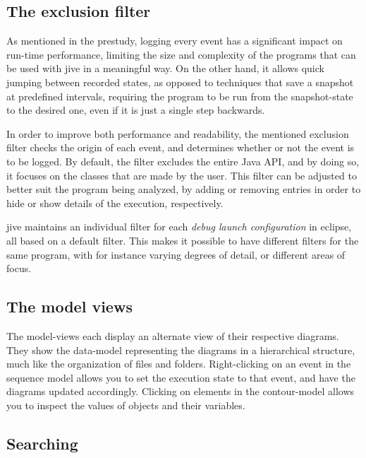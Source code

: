 \subsection{The exclusion filter}\label{jiveFeatFilter}

As mentioned in the prestudy, logging every event has a significant impact on run-time performance, limiting the size and complexity of the programs that can be used with \gls{jive} in a meaningful way.
On the other hand, it allows quick jumping between recorded states, as opposed to techniques that save a snapshot at predefined intervals, requiring the program to be run from the snapshot-state to the desired one, even if it is just a single step backwards.

In order to improve both performance and readability, the mentioned exclusion filter checks the origin of each event, and determines whether or not the event is to be logged.
By default, the filter excludes the entire Java API, and by doing so, it focuses on the classes that are made by the user.
This filter can be adjusted to better suit the program being analyzed, by adding or removing entries in order to hide or show details of the execution, respectively.

\gls{jive} maintains an individual filter for each \emph{debug launch configuration} in eclipse, all based on a default filter.
This makes it possible to have different filters for the same program, with for instance varying degrees of detail, or different areas of focus.

\subsection{The model views}\label{jiveFeatModelView}

The model-views each display an alternate view of their respective diagrams.
They show the data-model representing the diagrams in a hierarchical structure, much like the organization of files and folders.
Right-clicking on an event in the sequence model allows you to set the execution state to that event, and have the diagrams updated accordingly.
Clicking on elements in the contour-model allows you to inspect the values of objects and their variables.

\subsection{Searching}\label{jiveFeatSearch}

